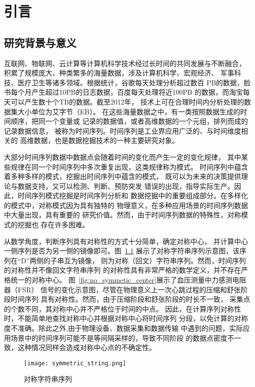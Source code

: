 
\chapter{引言}

\section{研究背景与意义}
互联网、物联网、云计算等计算机科学技术经过长时间的共同发展与不断融合，
积累了规模庞大、种类繁多的海量数据，涉及计算机科学、宏观经济、
军事科技、医疗卫生等诸多领域。根据统计，谷歌每天处理分析超过数百
PB的数据，脸书每个月产生超过10PB的日志数据，百度每天处理将近100PB
的数据，而淘宝每天可以产生数十个TB的数据。截至2012年，
技术上可在合理时间内分析处理的数据集大小单位为艾字节（EB）。
在这些海量数据之中，有一类按照数据生成的时间顺序，把同一个变量或
记录的数据值，或者高维数据的一个元组，排列而成的记录数据信息，
被称为时间序列。时间序列是工业界应用广泛的、与时间维度相关的
高维数据，也是数据挖掘技术的一种主要研究对象。

大部分时间序列数据中数据点会随着时间的变化而产生一定的变化规律，
其中某些规律在同一个时间序列中多次重复出现，这类规律称为模式。
时间序列中蕴含着多种多样的模式，挖掘出时间序列中蕴含的模式，
既可以为未来的决策提供理论与数据支持，又可以检测、判断、预防突发
错误的出现，指导实际生产。因此，时间序列模式挖掘是时间序列分析和
数据挖掘中的重要组成部分。在多样化的模式中，对称模式因为具有独特的
物理意义，在多种应用场景的时间序列数据中大量出现，具有重要的
研究价值。然而，由于时间序列数据的特殊性，对称模式的挖掘也
存在许多困难。

从数学角度，判断序列具有对称性的方式十分简单，确定对称中心，
并计算中心一侧序列是否为另一侧的镜像即可。图~\ref{fig:symmetric_string}
展示了对称字符串序列示意图，该序列在“D”两侧的子串互为镜像，
则为对称（回文）字符串序列。然而，时间序列的对称性并不像回文字符串序列
的对称性具有非常严格的数学定义，并不存在严格统一的对称中心。
图~\ref{fig:no_symmetic_center}展示了血压测量中力感测电阻器（FSR）
信号的变化示意图，尽管在物理意义上一次心跳过程的压缩和舒张阶段时间序列
具有对称性。然而，由于压缩阶段和舒张阶段的时长不一致，
采集点的个数不同，其对称中心并不严格位于时间的中点。
因此，在计算序列对称性时，不能简单地查找对称中心并根据对称中心将时间序列
分段，以免计算的对称度不准确。除此之外,由于物理设备、数据采集和数据传输
中遇到的问题，实际应用场景中的时间序列可能不是等间隔采样的，导致不同阶段
的数据点密度不一致，这种情况同样会造成对称中心点的不确定性。
\begin{figure}[t]
  \centering
  \texttt{[image: symmetric\_string.png]}
  \caption{对称字符串序列}
  \label{fig:symmetric_string}
\end{figure}

